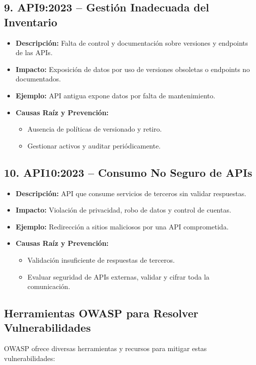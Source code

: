 \documentclass[a4paper,12pt]{article}
\begin{document}
\subsection{9. API9:2023 – Gestión Inadecuada del Inventario}
\begin{itemize}
    \item \textbf{Descripción:} Falta de control y documentación sobre versiones y endpoints de las APIs.
    \item \textbf{Impacto:} Exposición de datos por uso de versiones obsoletas o endpoints no documentados.
    \item \textbf{Ejemplo:} API antigua expone datos por falta de mantenimiento.
    \item \textbf{Causas Raíz y Prevención:}
    \begin{itemize}
        \item Ausencia de políticas de versionado y retiro.
        \item Gestionar activos y auditar periódicamente.
    \end{itemize}
\end{itemize}

\subsection{10. API10:2023 – Consumo No Seguro de APIs}
\begin{itemize}
    \item \textbf{Descripción:} API que consume servicios de terceros sin validar respuestas.
    \item \textbf{Impacto:} Violación de privacidad, robo de datos y control de cuentas.
    \item \textbf{Ejemplo:} Redirección a sitios maliciosos por una API comprometida.
    \item \textbf{Causas Raíz y Prevención:}
    \begin{itemize}
        \item Validación insuficiente de respuestas de terceros.
        \item Evaluar seguridad de APIs externas, validar y cifrar toda la comunicación.
    \end{itemize}
\end{itemize}

\subsection{Herramientas OWASP para Resolver Vulnerabilidades}
OWASP ofrece diversas herramientas y recursos para mitigar estas vulnerabilidades:
\end{document}
